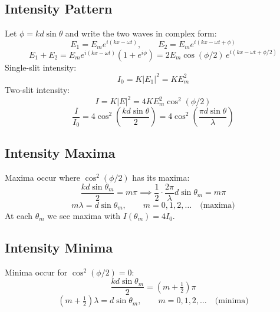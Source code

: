 \documentclass[11pt]{report}
\begin{document}
\subsection*{Intensity Pattern}

Let $\phi = kd\sin\theta$ and write the two waves in complex form:
\begin{equation}
E_1 = E_m e^{i(kx-\omega t)}, \qquad E_2 = E_m e^{i(kx-\omega t + \phi)}
\end{equation}
\begin{equation}
E_1 + E_2 = E_m e^{i(kx-\omega t)}(1 + e^{i\phi}) = 2 E_m \cos(\phi/2)\, e^{i(kx-\omega t + \phi/2)}
\end{equation}
Single-slit intensity:
\begin{equation}
I_0 = K|E_1|^2 = K E_m^2
\end{equation}
Two-slit intensity:
\begin{equation}
I = K|E|^2 = 4 K E_m^2 \cos^2(\phi/2)
\end{equation}
\begin{equation}
\boxed{\frac{I}{I_0} = 4\cos^2\!\left(\frac{kd\sin\theta}{2}\right) = 4\cos^2\!\left(\frac{\pi d \sin\theta}{\lambda}\right)}
\end{equation}

\subsection*{Intensity Maxima}

Maxima occur where $\cos^2(\phi/2)$ has its maxima:
\begin{equation}
\frac{kd\sin\theta_m}{2} = m\pi \implies \frac{1}{2}\cdot\frac{2\pi}{\lambda}d\sin\theta_m = m\pi
\end{equation}
\begin{equation}
\boxed{m\lambda = d\sin\theta_m, \qquad m = 0, 1, 2, \ldots \quad \text{(maxima)}}
\end{equation}
At each $\theta_m$ we see maxima with $I(\theta_m) = 4 I_0$.

\subsection*{Intensity Minima}

Minima occur for $\cos^2(\phi/2) = 0$:
\begin{equation}
\frac{kd\sin\theta_m}{2} = (m + \tfrac{1}{2})\pi
\end{equation}
\begin{equation}
\boxed{(m + \tfrac{1}{2})\lambda = d\sin\theta_m, \qquad m = 0, 1, 2, \ldots \quad \text{(minima)}}
\end{equation}
\end{document}
